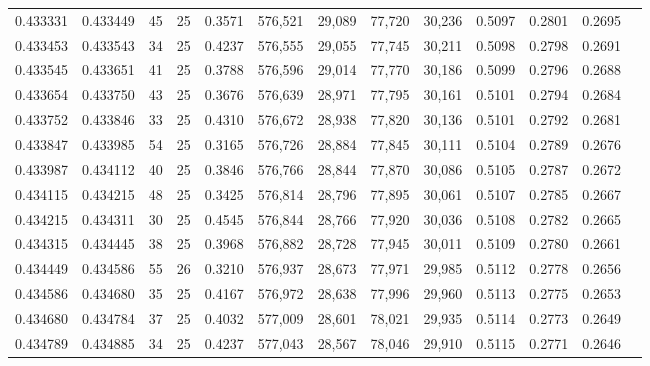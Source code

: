 \begin{tabular}{rrrrrrrrrrrrr}
0.433331 & 0.433449 &    45 &  25 &                                     0.3571 & 576,521 &  29,089 &  77,720 &  30,236 & 0.5097 & 0.2801 & 0.2695 \\
0.433453 & 0.433543 &    34 &  25 &                                     0.4237 & 576,555 &  29,055 &  77,745 &  30,211 & 0.5098 & 0.2798 & 0.2691 \\
0.433545 & 0.433651 &    41 &  25 &                                     0.3788 & 576,596 &  29,014 &  77,770 &  30,186 & 0.5099 & 0.2796 & 0.2688 \\
0.433654 & 0.433750 &    43 &  25 &                                     0.3676 & 576,639 &  28,971 &  77,795 &  30,161 & 0.5101 & 0.2794 & 0.2684 \\
0.433752 & 0.433846 &    33 &  25 &                                     0.4310 & 576,672 &  28,938 &  77,820 &  30,136 & 0.5101 & 0.2792 & 0.2681 \\
0.433847 & 0.433985 &    54 &  25 &                                     0.3165 & 576,726 &  28,884 &  77,845 &  30,111 & 0.5104 & 0.2789 & 0.2676 \\
0.433987 & 0.434112 &    40 &  25 &                                     0.3846 & 576,766 &  28,844 &  77,870 &  30,086 & 0.5105 & 0.2787 & 0.2672 \\
0.434115 & 0.434215 &    48 &  25 &                                     0.3425 & 576,814 &  28,796 &  77,895 &  30,061 & 0.5107 & 0.2785 & 0.2667 \\
0.434215 & 0.434311 &    30 &  25 &                                     0.4545 & 576,844 &  28,766 &  77,920 &  30,036 & 0.5108 & 0.2782 & 0.2665 \\
0.434315 & 0.434445 &    38 &  25 &                                     0.3968 & 576,882 &  28,728 &  77,945 &  30,011 & 0.5109 & 0.2780 & 0.2661 \\
0.434449 & 0.434586 &    55 &  26 &                                     0.3210 & 576,937 &  28,673 &  77,971 &  29,985 & 0.5112 & 0.2778 & 0.2656 \\
0.434586 & 0.434680 &    35 &  25 &                                     0.4167 & 576,972 &  28,638 &  77,996 &  29,960 & 0.5113 & 0.2775 & 0.2653 \\
0.434680 & 0.434784 &    37 &  25 &                                     0.4032 & 577,009 &  28,601 &  78,021 &  29,935 & 0.5114 & 0.2773 & 0.2649 \\
0.434789 & 0.434885 &    34 &  25 &                                     0.4237 & 577,043 &  28,567 &  78,046 &  29,910 & 0.5115 & 0.2771 & 0.2646 \\

\end{tabular}
